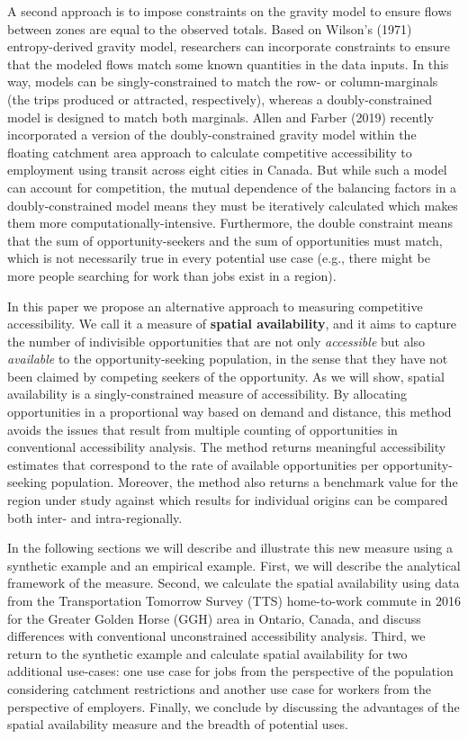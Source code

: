 \documentclass[]{elsarticle} %
\begin{document}
A second approach is to impose constraints on the gravity model to
ensure flows between zones are equal to the observed totals. Based on
Wilson's (1971) entropy-derived gravity model, researchers can
incorporate constraints to ensure that the modeled flows match some
known quantities in the data inputs. In this way, models can be
singly-constrained to match the row- or column-marginals (the trips
produced or attracted, respectively), whereas a doubly-constrained model
is designed to match both marginals. Allen and Farber (2019) recently
incorporated a version of the doubly-constrained gravity model within
the floating catchment area approach to calculate competitive
accessibility to employment using transit across eight cities in Canada.
But while such a model can account for competition, the mutual
dependence of the balancing factors in a doubly-constrained model means
they must be iteratively calculated which makes them more
computationally-intensive. Furthermore, the double constraint means that
the sum of opportunity-seekers and the sum of opportunities must match,
which is not necessarily true in every potential use case (e.g., there
might be more people searching for work than jobs exist in a region).

In this paper we propose an alternative approach to measuring
competitive accessibility. We call it a measure of \textbf{spatial
availability}, and it aims to capture the number of indivisible
opportunities that are not only \emph{accessible} but also
\emph{available} to the opportunity-seeking population, in the sense
that they have not been claimed by competing seekers of the opportunity.
As we will show, spatial availability is a singly-constrained measure of
accessibility. By allocating opportunities in a proportional way based
on demand and distance, this method avoids the issues that result from
multiple counting of opportunities in conventional accessibility
analysis. The method returns meaningful accessibility estimates that
correspond to the rate of available opportunities per
opportunity-seeking population. Moreover, the method also returns a
benchmark value for the region under study against which results for
individual origins can be compared both inter- and intra-regionally.

In the following sections we will describe and illustrate this new
measure using a synthetic example and an empirical example. First, we
will describe the analytical framework of the measure. Second, we
calculate the spatial availability using data from the Transportation
Tomorrow Survey (TTS) home-to-work commute in 2016 for the Greater
Golden Horse (GGH) area in Ontario, Canada, and discuss differences with
conventional unconstrained accessibility analysis. Third, we return to
the synthetic example and calculate spatial availability for two
additional use-cases: one use case for jobs from the perspective of the
population considering catchment restrictions and another use case for
workers from the perspective of employers. Finally, we conclude by
discussing the advantages of the spatial availability measure and the
breadth of potential uses.
\end{document}
